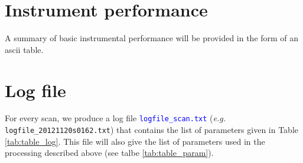 \documentclass[a4paper,10pt]{article}
\begin{document}
\section{Instrument performance}
A summary of basic instrumental performance will be provided in the form of an ascii table.


\section{Log file}
For every scan, we produce a log file \textcolor{blue}{{\tt logfile\_scan.txt}} ({\it e.g.} {\tt logfile\_20121120s0162.txt}) that contains the list of parameters given in 
Table \ref{tab:table_log}.  This file will also give the list of parameters used in the processing described above (see talbe \ref{tab:table_param}).
\end{document}
